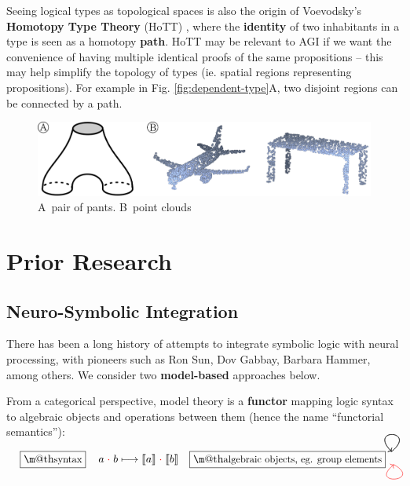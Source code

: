 \documentclass[orivec]{llncs}
\makeatletter
\newcommand{\tikzmark}[1]{\tikz[overlay,remember picture] \node (#1) {};}
\newcommand{\circA}{\textcircled{\scriptsize{A}} \,}
\newcommand{\circB}{\textcircled{\scriptsize{B}} \,}
\renewcommand{\boxed}[1]{\fbox{\m@th$\displaystyle\scalebox{0.9}{#1}$} \,}
\makeatother
\begin{document}
Seeing logical types as topological spaces is also the origin of Voevodsky's \textbf{Homotopy Type Theory} (HoTT) \cite{Voevodsky2013}, where the \textbf{identity} of two inhabitants in a type is seen as a homotopy \textbf{path}.  HoTT may be relevant to AGI if we want the convenience of having multiple identical proofs of the same propositions -- this may help simplify the topology of types (ie. spatial regions representing propositions).  For example in Fig. \ref{fig:dependent-type}A, two disjoint regions can be connected by a path.

\begin{figure}[h]
\centering
\includegraphics[scale=0.5]{figure-1.png}
\caption{\circA pair of pants. \circB point clouds}
\label{fig:1}
\end{figure}

\section{Prior Research}

\subsection{Neuro-Symbolic Integration}

There has been a long history of attempts to integrate symbolic logic with neural processing, with pioneers such as Ron Sun, Dov Gabbay, Barbara Hammer, among others.  We consider two \textbf{model-based} approaches below.

From a categorical perspective, model theory is a \textbf{functor} mapping logic syntax to algebraic objects and operations between them (hence the name ``functorial semantics''):

\begin{equation}
\boxed{\mbox{syntax}} \quad
\tikzmark{a1} a \tikzmark{c1} \; {\color{red}\cdot} \; \tikzmark{b1} b \longmapsto \llbracket \tikzmark{a2} a \rrbracket \tikzmark{c2} \; {\color{red}\cdot} \; \llbracket \tikzmark{b2} b \rrbracket
\quad \boxed{\mbox{algebraic objects, eg. group elements}}
\begin{tikzpicture}[overlay, remember picture, distance=1.1cm]
\draw[->, out=40, in=135, transform canvas={shift={(4pt,10pt)}}] (a1.center) to (a2.center);
\draw[->, out=40, in=135, transform canvas={shift={(4pt,10pt)}}] (b1.center) to (b2.center);
\draw[->, out=-30, in=-140, transform canvas={shift={(6pt,-2pt)}}, red] (c1.center) to (c2.center);
\end{tikzpicture}
\end{equation}
\end{document}
